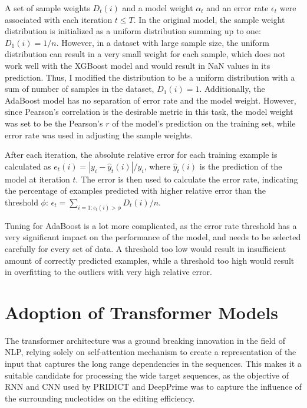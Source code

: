 A set of sample weights $D_t(i)$ and a model weight $\alpha_t$ and an error rate $\epsilon_t$ were associated with each iteration $t\leq T$.
In the original model, the sample weight distribution is initialized as a uniform distribution summing up to one: $D_1(i) = 1/n$. However, in a dataset with large sample size, the uniform distribution can result in a very small weight for each sample, which does not work well with the XGBoost model and would result in NaN values in its prediction. Thus, I modified the distribution to be a uniform distribution with a sum of number of samples in the dataset, $D_1(i) = 1$. Additionally, the AdaBoost model has no separation of error rate and the model weight. However, since Pearson's correlation is the desirable metric in this task, the model weight was set to be the Pearson's $r$ of the model's prediction on the training set, while error rate was used in adjusting the sample weights.

After each iteration, the absolute relative error for each training example is calculated as $e_t(i) = |y_i - \hat{y}_t(i)|/y_i$, where $\hat{y}_t(i)$ is the prediction of the model at iteration $t$. The error is then used to calculate the error rate, indicating the percentage of examples predicted with higher relative error than the threshold $\phi$: $\epsilon_t = \sum_{i=1: e_t(i) > \phi} D_t(i) / n$.


Tuning for AdaBoost is a lot more complicated, as the error rate threshold has a very significant impact on the performance of the model, and needs to be selected carefully for every set of data. A threshold too low would result in insufficient amount of correctly predicted examples, while a threshold too high would result in overfitting to the outliers with very high relative error\cite{shresthaExperimentsAdaBoostRT2006}. 



\section{Adoption of Transformer Models}

The transformer architecture was a ground breaking innovation in the field of NLP, relying solely on self-attention mechanism to create a representation of the input that captures the long range dependencies in the sequences\cite{vaswaniAttentionAllYou2017}. This makes it a suitable candidate for processing the wide target sequences, as the objective of RNN and CNN used by PRIDICT and DeepPrime was to capture the influence of the surrounding nucleotides on the editing efficiency.

